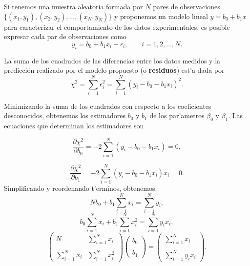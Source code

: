 \documentclass[a4paper]{report}
\begin{document}
Si tenemos una muestra aleatoria formada por $N$ pares de observaciones $\{(x_{1},y_{1}),(x_{2},y_{2}),\dots ,(x_{N},y_{N}) \}$ y proponemos un modelo lineal $y=b_0 + b_1 x$ para caracterizar el comportamiento de los datos experimentales, es posible expresar cada par de observaciones como
\begin{equation}
y_{i}=b_0 + b_1 x_{i} +\epsilon_{i},\qquad	i=1,2, \dots, N.
\end{equation}

La suma de los cuadrados de las diferencias entre los datos medidos y la predicción realizado por el modelo propuesto (o \textbf{residuos}) est'a dada por
\begin{equation}
\chi^2= \sum_{i=1}^N\epsilon_{i}^{2}= \sum_{i=1}^N (y_{i} - b_0 - b_1 x_{i})^{2}.
\end{equation}

Minimizando la suma de los cuadrados con respecto a los coeficientes desconocidos, obtenemos los estimadores $b_0$ y $b_1$ de los par'ametros $\beta_0$ y $\beta_1$. Las ecuaciones que determinan los estimadores son

\begin{equation}
\frac{\partial \chi^2}{\partial b_0}=-2 \sum_{i=1}^N (y_{i} - b_0 - b_1 x_{i})=0,
\end{equation}

\begin{equation}
\frac{\partial \chi^2}{\partial b_1}=-2 \sum_{i=1}^N (y_{i} - b_0 - b_1 x_{i})x_i=0.
\end{equation}
Simplificando y reordenando t'erminos, obtenemos:
\begin{equation}
N b_0 + b_1\sum_{i=1}^N x_{i}=\sum_{i=1}^N y_{i},
\end{equation}
\begin{equation}
b_0\sum_{i=1}^N x_{i}  + b_1\sum_{i=1}^N x_{i}^{2}=\sum_{i=1}^N y_{i}x_{i},
\end{equation}
\begin{equation}
\left( \begin{array} {cc}
N&\sum_{i=1}^N x_{i} \\  \\
\sum_{i=1}^N x_{i}&\sum_{i=1}^N x_{i}^{2} 
 \end{array}\right) \left( \begin{array} {c}
 b_0 \\  \\
 b_1 
  \end{array}\right)=\left( \begin{array} {c}
   \sum_{i=1}^N x_{i} \\  \\
   \sum_{i=1}^N y_{i}x_{i} 
    \end{array}\right).
\end{equation}
\end{document}
